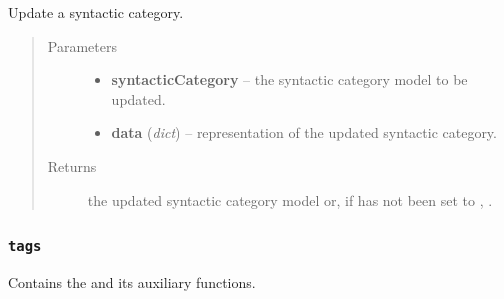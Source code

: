 \documentclass[letterpaper,10pt,english]{sphinxmanual}
\begin{document}
\begin{fulllineitems}
\label{api:onlinelinguisticdatabase.controllers.syntacticcategories.updateSyntacticCategory}
Update a syntactic category.
\begin{quote}\begin{description}
\item[{Parameters}] \leavevmode\begin{itemize}
\item {} 
\textbf{syntacticCategory} -- the syntactic category model to be updated.

\item {} 
\textbf{data} (\emph{dict}) -- representation of the updated syntactic category.

\end{itemize}

\item[{Returns}] \leavevmode
the updated syntactic category model or, if  has not
been set to , .

\end{description}\end{quote}

\end{fulllineitems}



\subsubsection{\texttt{tags}}
\label{api:module-onlinelinguisticdatabase.controllers.tags}\label{api:tags}
Contains the {\hyperref[api:onlinelinguisticdatabase.controllers.tags.TagsController]{}} and its auxiliary functions.
\label{api:module-tags}
\end{document}
